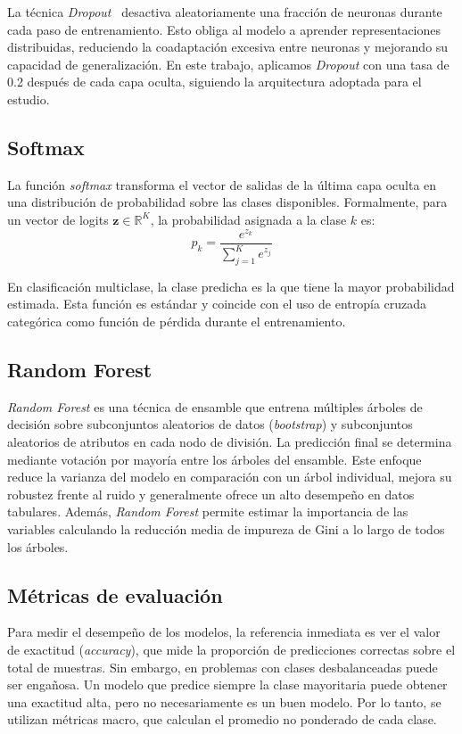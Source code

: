 \documentclass[conference]{IEEEtran}
\begin{document}
La técnica \textit{Dropout}~\cite{dropout} desactiva aleatoriamente una fracción de neuronas durante cada paso de entrenamiento. Esto obliga al modelo a aprender representaciones distribuidas, reduciendo la coadaptación excesiva entre neuronas y mejorando su capacidad de generalización. En este trabajo, aplicamos \textit{Dropout} con una tasa de 0.2 después de cada capa oculta, siguiendo la arquitectura adoptada para el estudio.

\subsection{Softmax}

La función \textit{softmax} transforma el vector de salidas de la última capa oculta en una distribución de probabilidad sobre las clases disponibles. Formalmente, para un vector de logits $\mathbf{z} \in \mathbb{R}^K$, la probabilidad asignada a la clase $k$ es:
\begin{equation}
  p_k = \frac{e^{z_k}}{\sum_{j=1}^{K} e^{z_j}}
\end{equation}

En clasificación multiclase, la clase predicha es la que tiene la mayor probabilidad estimada. Esta función es estándar y coincide con el uso de entropía cruzada categórica como función de pérdida durante el entrenamiento.

\subsection{Random Forest}

\textit{Random Forest} es una técnica de ensamble que entrena múltiples árboles de decisión sobre subconjuntos aleatorios de datos (\textit{bootstrap}) y subconjuntos aleatorios de atributos en cada nodo de división. La predicción final se determina mediante votación por mayoría entre los árboles del ensamble. Este enfoque reduce la varianza del modelo en comparación con un árbol individual, mejora su robustez frente al ruido y generalmente ofrece un alto desempeño en datos tabulares. Además, \textit{Random Forest} permite estimar la importancia de las variables calculando la reducción media de impureza de Gini a lo largo de todos los árboles.

\subsection{Métricas de evaluación}

Para medir el desempeño de los modelos, la referencia inmediata es ver el valor de exactitud (\textit{accuracy}), que mide la proporción de predicciones correctas sobre el total de muestras. Sin embargo, en problemas con clases desbalanceadas puede ser engañosa. Un modelo que predice siempre la clase mayoritaria puede obtener una exactitud alta, pero no necesariamente es un buen modelo. Por lo tanto, se utilizan métricas macro, que calculan el promedio no ponderado de cada clase.
\end{document}
